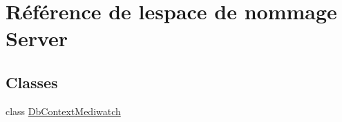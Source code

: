 \hypertarget{namespace_server}{}\section{Référence de l\textquotesingle{}espace de nommage Server}
\label{namespace_server}
\subsection*{Classes}
\begin{DoxyCompactItemize}
\item 
class \hyperlink{class_server_1_1_db_context_mediwatch}{Db\+Context\+Mediwatch}
\end{DoxyCompactItemize}
